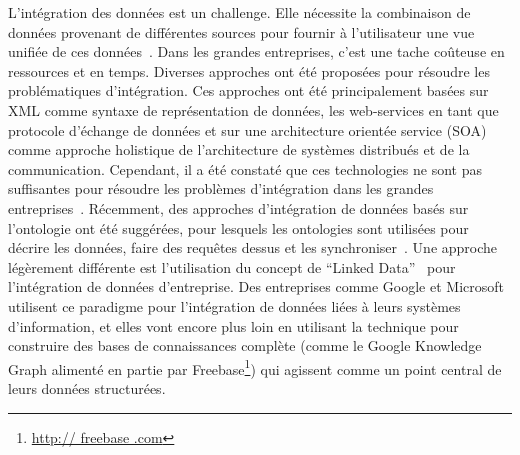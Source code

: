 L'int\'{e}gration des donn\'{e}es est un challenge. Elle n\'{e}cessite la combinaison de donn\'{e}es provenant de diff\'{e}rentes sources pour fournir à l'utilisateur une vue unifi\'{e}e de ces donn\'{e}es~\cite{Lenzerini:SIGMOD:02}. Dans les grandes entreprises, c'est une tache coûteuse en ressources et en temps. Diverses approches ont \'{e}t\'{e} propos\'{e}es pour r\'{e}soudre les probl\'{e}matiques d'int\'{e}gration. Ces approches ont \'{e}t\'{e} principalement bas\'{e}es sur XML comme syntaxe de repr\'{e}sentation de donn\'{e}es, les web-services en tant que protocole d'\'{e}change de donn\'{e}es et sur une architecture orient\'{e}e service (SOA) comme approche holistique de l'architecture de syst\`{e}mes distribu\'{e}s et de la communication. Cependant, il a \'{e}t\'{e} constat\'{e} que ces technologies ne sont pas suffisantes pour r\'{e}soudre les probl\`{e}mes d'int\'{e}gration dans les grandes entreprises~\cite{Frischmuth:ISWC:13,Frischmuth:SemWebJorunal:12}. R\'{e}cemment, des approches d'int\'{e}gration de donn\'{e}es bas\'{e}s sur l'ontologie ont \'{e}t\'{e} sugg\'{e}r\'{e}es, pour lesquels les ontologies sont utilis\'{e}es pour d\'{e}crire les donn\'{e}es, faire des requêtes dessus et les synchroniser~\cite{Wache:IJCAI:01}. Une approche l\'{e}g\`{e}rement diff\'{e}rente est l'utilisation du concept de ``Linked Data''~\cite{Bizer:IJSWIS:09} pour l'int\'{e}gration de donn\'{e}es d'entreprise. Des entreprises comme Google et Microsoft utilisent ce paradigme pour l'int\'{e}gration de donn\'{e}es li\'{e}es à leurs syst\`{e}mes d'information, et elles vont encore plus loin en utilisant la technique pour construire des bases de connaissances compl\`{e}te (comme le Google Knowledge Graph aliment\'{e} en partie par Freebase\footnote{\url{http:// freebase .com}}) qui agissent comme un point central de leurs donn\'{e}es structur\'{e}es.

